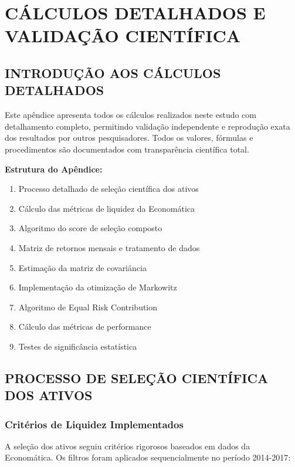 
\appendix
\chapter{CÁLCULOS DETALHADOS E VALIDAÇÃO CIENTÍFICA}

\section{INTRODUÇÃO AOS CÁLCULOS DETALHADOS}

Este apêndice apresenta todos os cálculos realizados neste estudo com detalhamento completo, permitindo validação independente e reprodução exata dos resultados por outros pesquisadores. Todos os valores, fórmulas e procedimentos são documentados com transparência científica total.

\textbf{Estrutura do Apêndice:}
\begin{enumerate}
    \item Processo detalhado de seleção científica dos ativos
    \item Cálculo das métricas de liquidez da Economática
    \item Algoritmo do score de seleção composto
    \item Matriz de retornos mensais e tratamento de dados
    \item Estimação da matriz de covariância
    \item Implementação da otimização de Markowitz
    \item Algoritmo de Equal Risk Contribution
    \item Cálculo das métricas de performance
    \item Testes de significância estatística
\end{enumerate}

\section{PROCESSO DE SELEÇÃO CIENTÍFICA DOS ATIVOS}

\subsection{Critérios de Liquidez Implementados}

A seleção dos ativos seguiu critérios rigorosos baseados em dados da Economática. Os filtros foram aplicados sequencialmente no período 2014-2017:

